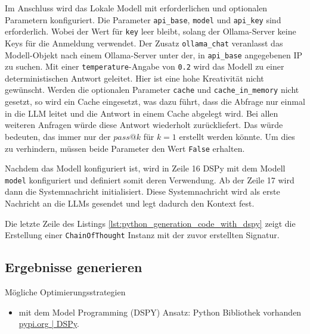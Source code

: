Im Anschluss wird das Lokale Modell mit erforderlichen und optionalen Parametern konfiguriert. Die Parameter \texttt{api\_base}, \texttt{model} und \texttt{api\_key} sind erforderlich. Wobei der Wert für \texttt{key} leer bleibt, solang der Ollama-Server keine Keys für die Anmeldung verwendet. Der Zusatz \texttt{ollama\_chat} veranlasst das Modell-Objekt nach einem Ollama-Server unter der, in \texttt{api\_base} angegebenen IP zu suchen. Mit einer \texttt{temperature}-Angabe von \texttt{0.2} wird das Modell zu einer deterministischen Antwort geleitet. Hier ist eine hohe Kreativität nicht gewünscht. Werden die optionalen Parameter \texttt{cache} und \texttt{cache\_in\_memory} nicht gesetzt, so wird ein Cache eingesetzt, was dazu führt, dass die Abfrage nur einmal in die LLM leitet und die Antwort in einem Cache abgelegt wird. Bei allen weiteren Anfragen würde diese Antwort wiederholt zurückliefert. Das würde bedeuten, das immer nur der $pass@k$ für $k=1$ erstellt werden könnte. Um dies zu verhindern, müssen beide Parameter den Wert \texttt{False} erhalten.\vspace{0.2cm}

Nachdem das Modell konfiguriert ist, wird in Zeile 16 DSPy mit dem Modell \texttt{model} konfiguriert und definiert somit deren Verwendung. Ab der Zeile 17 wird dann die Systemnachricht initialisiert. Diese Systemnachricht wird als erste Nachricht an die LLMs gesendet und legt dadurch den Kontext fest.\vspace{0.2cm}

Die letzte Zeile des Listings \ref{lst:python_generation_code_with_dspy} zeigt die Erstellung einer \texttt{ChainOfThought} Instanz mit der zuvor erstellten Signatur.


\subsection{Ergebnisse generieren}
\begin{tcolorbox}[
	enhanced,
	colback=red!5!white,
	colframe=red!75!black!50,
	title= Mein roter Faden
	]
	Mögliche Optimierungsstrategien
	\begin{itemize}
		\item mit dem Model Programming (DSPY) Ansatz: Python Bibliothek vorhanden \href{https://pypi.org/project/dspy/}{pypi.org | DSPy}.
	\end{itemize}
\end{tcolorbox}



